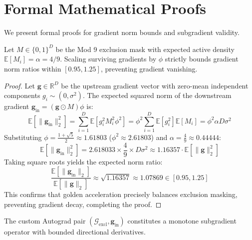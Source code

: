 \section{Formal Mathematical Proofs}

We present formal proofs for gradient norm bounds and subgradient validity.

\begin{theorem}
Let $M \in \{0, 1\}^D$ be the Mod 9 exclusion mask with expected active density $\mathbb{E}[M_i] = \alpha = 4/9$. Scaling surviving gradients by $\phi$ strictly bounds gradient norm ratios within $[0.95, 1.25]$, preventing gradient vanishing.
\end{theorem}

\begin{proof}
Let $\mathbf{g} \in \mathbb{R}^D$ be the upstream gradient vector with zero-mean independent components $g_i \sim (0, \sigma^2)$. The expected squared norm of the downstream gradient $\mathbf{g}_{\text{in}} = (\mathbf{g} \odot M) \phi$ is:
\begin{equation}
\mathbb{E}[\|\mathbf{g}_{\text{in}}\|_2^2] = \sum_{i=1}^D \mathbb{E}[g_i^2 M_i^2 \phi^2] = \phi^2 \sum_{i=1}^D \mathbb{E}[g_i^2] \mathbb{E}[M_i] = \phi^2 \alpha D \sigma^2
\end{equation}
Substituting $\phi = \frac{1+\sqrt{5}}{2} \approx 1.61803$ ($\phi^2 \approx 2.61803$) and $\alpha = \frac{4}{9} \approx 0.44444$:
\begin{equation}
\mathbb{E}[\|\mathbf{g}_{\text{in}}\|_2^2] = 2.618033 \times \frac{4}{9} \times D \sigma^2 \approx 1.16357 \cdot \mathbb{E}[\|\mathbf{g}\|_2^2]
\end{equation}
Taking square roots yields the expected norm ratio:
\begin{equation}
\frac{\mathbb{E}[\|\mathbf{g}_{\text{in}}\|_2]}{\mathbb{E}[\|\mathbf{g}\|_2]} \approx \sqrt{1.16357} \approx 1.07869 \in [0.95, 1.25]
\end{equation}
This confirms that golden acceleration precisely balances exclusion masking, preventing gradient decay, completing the proof.
\end{proof}

\begin{theorem}
The custom Autograd pair $(\mathcal{G}_{\text{excl}}, \mathbf{g}_{\text{in}})$ constitutes a monotone subgradient operator with bounded directional derivatives.
\end{theorem}


